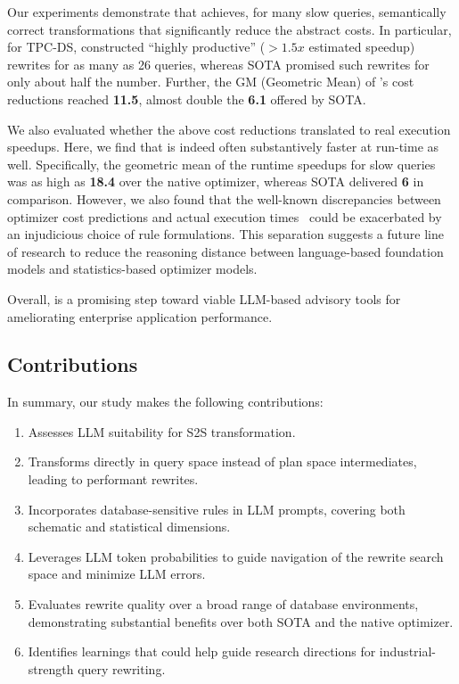 Our experiments demonstrate that \lithe achieves, for many slow queries, semantically correct transformations that significantly reduce the abstract costs.
In particular, for TPC-DS, \lithe constructed ``highly productive'' ($ > 1.5x$ estimated speedup) rewrites for as many as 26 queries, whereas SOTA promised such rewrites for only about half the number. Further, the GM (Geometric Mean) of \lithe's cost reductions reached {\bf 11.5}, almost double the {\bf 6.1} offered by SOTA.

We also evaluated whether the above cost reductions translated to real execution speedups. Here, we find that 
\lithe is indeed often substantively faster at run-time as well.  Specifically, the geometric mean of the runtime speedups for slow queries was as high as \textbf{18.4} over the native optimizer, whereas SOTA delivered \textbf{6} in comparison.  However, we also found that the well-known discrepancies between optimizer cost predictions and actual execution times~\cite{lohmanblog} could be exacerbated by an injudicious choice of rule formulations.
This separation suggests a future line of research to reduce the reasoning distance between language-based foundation models and statistics-based optimizer models.

Overall, \lithe is a promising step toward viable LLM-based advisory tools for ameliorating enterprise application performance.

\subsection*{Contributions}
In summary, our study makes the following contributions: 
\begin{enumerate} %
\item Assesses LLM suitability for S2S transformation. 
\item Transforms directly in query space instead of plan space intermediates, leading to performant rewrites.
\item Incorporates database-sensitive rules in LLM prompts, covering both schematic and statistical dimensions.
\item Leverages LLM token probabilities to guide navigation of the rewrite search space and minimize LLM errors.
\item Evaluates rewrite quality over a broad range of database environments, demonstrating substantial benefits over both SOTA and the native optimizer.
\item Identifies learnings that could help guide research directions for industrial-strength query rewriting.
\end{enumerate}


